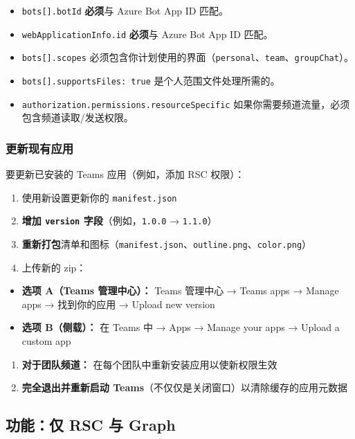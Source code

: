 \begin{itemize}
  \item \texttt{bots[].botId} \textbf{必须}与 Azure Bot App ID 匹配。
  \item \texttt{webApplicationInfo.id} \textbf{必须}与 Azure Bot App ID 匹配。
  \item \texttt{bots[].scopes} 必须包含你计划使用的界面（\texttt{personal}、\texttt{team}、\texttt{groupChat}）。
  \item \texttt{bots[].supportsFiles: true} 是个人范围文件处理所需的。
  \item \texttt{authorization.permissions.resourceSpecific} 如果你需要频道流量，必须包含频道读取/发送权限。
\end{itemize}


\subsubsection{更新现有应用}


要更新已安装的 Teams 应用（例如，添加 RSC 权限）：

\begin{enumerate}
  \item 使用新设置更新你的 \texttt{manifest.json}
  \item \textbf{增加 \texttt{version} 字段}（例如，\texttt{1.0.0} → \texttt{1.1.0}）
  \item \textbf{重新打包}清单和图标（\texttt{manifest.json}、\texttt{outline.png}、\texttt{color.png}）
  \item 上传新的 zip：
\end{enumerate}

\begin{itemize}
  \item \textbf{选项 A（Teams 管理中心）：} Teams 管理中心 → Teams apps → Manage apps → 找到你的应用 → Upload new version
  \item \textbf{选项 B（侧载）：} 在 Teams 中 → Apps → Manage your apps → Upload a custom app
\end{itemize}

\begin{enumerate}
  \item \textbf{对于团队频道：} 在每个团队中重新安装应用以使新权限生效
  \item \textbf{完全退出并重新启动 Teams}（不仅仅是关闭窗口）以清除缓存的应用元数据
\end{enumerate}


\subsection{功能：仅 RSC 与 Graph}


